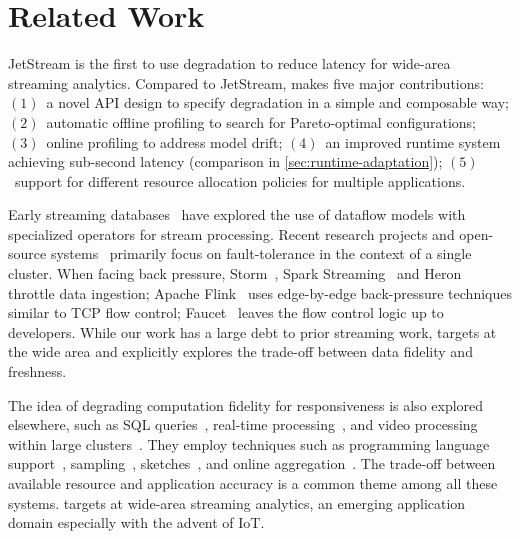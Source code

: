 \documentclass[thesis.tex]{subfiles}
\begin{document}
\section{Related Work}
\label{sec:related-work}

 JetStream is the first to use degradation to
reduce latency for wide-area streaming analytics. Compared to JetStream,
\sysname{} makes five major contributions: $(1)$~a novel API design to specify
degradation in a simple and composable way; $(2)$~automatic offline profiling to
search for Pareto-optimal configurations; $(3)$~online profiling to address
model drift; $(4)$~an improved runtime system achieving sub-second latency
(comparison in \autoref{sec:runtime-adaptation}); $(5)$~support for different
resource allocation policies for multiple applications.

 Early streaming
databases~\cite{abadi2005design, chandrasekaran2003telegraphcq} have explored
the use of dataflow models with specialized operators for stream
processing. Recent research projects and open-source
systems~\cite{akidau2013millwheel, toshniwal2014storm, sanjeev2015twitter,
  zaharia2013discretized, carbone2015apache} primarily focus on fault-tolerance
in the context of a single cluster. When facing back pressure,
Storm~\cite{toshniwal2014storm}, Spark Streaming~\cite{zaharia2013discretized}
and Heron~\cite{sanjeev2015twitter} throttle data ingestion; Apache
Flink~\cite{carbone2015apache} uses edge-by-edge back-pressure techniques
similar to TCP flow control; Faucet~\cite{lattuada2016faucet} leaves the flow
control logic up to developers.  While our work has a large debt to prior
streaming work, \sysname{} targets at the wide area and explicitly explores the
trade-off between data fidelity and freshness.

 The idea of degrading computation fidelity for
responsiveness is also explored elsewhere, such as SQL
queries~\cite{agarwal2013blinkdb, ananthanarayanan2014grass}, real-time
processing~\cite{farrell2016meantime}, and video processing within large
clusters~\cite{zhang2017live}. They employ techniques such as programming
language support~\cite{sampson2011enerj},
sampling~\cite{garofalakis2001approximate}, sketches~\cite{cormode2011sketch},
and online aggregation~\cite{hellerstein1997online}. The trade-off between
available resource and application accuracy is a common theme among all these
systems. \sysname{} targets at wide-area streaming analytics, an emerging
application domain especially with the advent of IoT\@.
\end{document}
